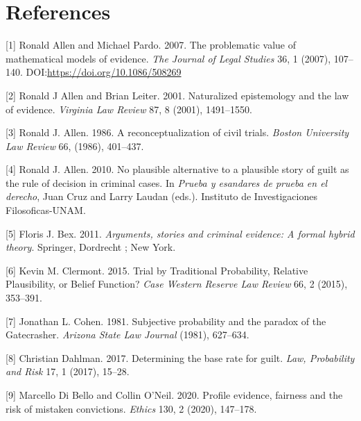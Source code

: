 \documentclass[11pt,dvipsnames,enabledeprecatedfontcommands]{scrartcl}
\begin{document}
\vspace{-2mm}

\section*{References}\label{references}

\vspace{-4mm}

\footnotesize 

\hypertarget{refs}{}
\hypertarget{ref-allen2007problematic}{}
{[}1{]} Ronald Allen and Michael Pardo. 2007. The problematic value of
mathematical models of evidence. \emph{The Journal of Legal Studies} 36,
1 (2007), 107--140. DOI:\url{https://doi.org/10.1086/508269}

\hypertarget{ref-allen2001naturalized}{}
{[}2{]} Ronald J Allen and Brian Leiter. 2001. Naturalized epistemology
and the law of evidence. \emph{Virginia Law Review} 87, 8 (2001),
1491--1550.

\hypertarget{ref-Allen1986A-Reconceptuali}{}
{[}3{]} Ronald J. Allen. 1986. A reconceptualization of civil trials.
\emph{Boston University Law Review} 66, (1986), 401--437.

\hypertarget{ref-Allen2010No-Plausible-Al}{}
{[}4{]} Ronald J. Allen. 2010. No plausible alternative to a plausible
story of guilt as the rule of decision in criminal cases. In
\emph{Prueba y esandares de prueba en el derecho}, Juan Cruz and Larry
Laudan (eds.). Instituto de Investigaciones Filosoficas-UNAM.

\hypertarget{ref-bex2011ArgumentsStoriesCriminal}{}
{[}5{]} Floris J. Bex. 2011. \emph{Arguments, stories and criminal
evidence: A formal hybrid theory}. Springer, Dordrecht ; New York.

\hypertarget{ref-clermont2015TrialTraditionalProbability}{}
{[}6{]} Kevin M. Clermont. 2015. Trial by Traditional Probability,
Relative Plausibility, or Belief Function? \emph{Case Western Reserve
Law Review} 66, 2 (2015), 353--391.

\hypertarget{ref-Cohen81}{}
{[}7{]} Jonathan L. Cohen. 1981. Subjective probability and the paradox
of the Gatecrasher. \emph{Arizona State Law Journal} (1981), 627--634.

\hypertarget{ref-dahlman2017}{}
{[}8{]} Christian Dahlman. 2017. Determining the base rate for guilt.
\emph{Law, Probability and Risk} 17, 1 (2017), 15--28.

\hypertarget{ref-DiBelloONeil2020}{}
{[}9{]} Marcello Di Bello and Collin O'Neil. 2020. Profile evidence,
fairness and the risk of mistaken convictions. \emph{Ethics} 130, 2
(2020), 147--178.
\end{document}
